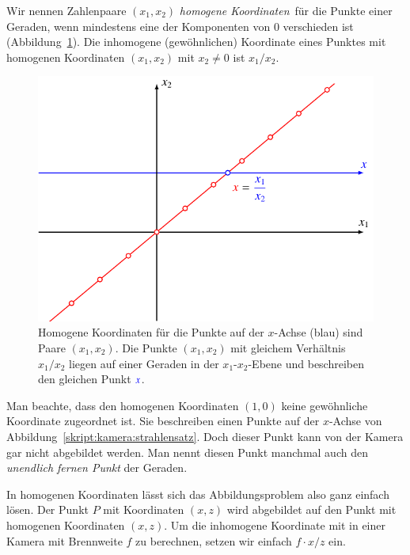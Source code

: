 \begin{definition}
Wir nennen Zahlenpaare $(x_1,x_2)$ {\em homogene Koordinaten} für die
Punkte einer Geraden, wenn mindestens eine der Komponenten von $0$
verschieden ist (Abbildung~\ref{applications:kamera:homogenekoordinaten}).
Die inhomogene (gewöhnlichen) Koordinate eines Punktes mit
homogenen Koordinaten $(x_1,x_2)$ mit $x_2\ne 0$ ist $x_1/x_2$.
\end{definition}
%
\begin{figure}
\centering
\includegraphics{applications/kamera/homogenekoordinaten.pdf}
\caption{Homogene Koordinaten für die Punkte auf der $x$-Achse
({\color{blue}blau}) sind Paare $(x_1,x_2)$.
Die Punkte {\color{red}$(x_1,x_2)$} mit gleichem Verhältnis $x_1/x_2$
liegen auf einer
Geraden in der $x_1$-$x_2$-Ebene und beschreiben den gleichen Punkt
$\color{blue}x$.
\label{applications:kamera:homogenekoordinaten}}
\end{figure}
Man beachte, dass den homogenen Koordinaten $(1,0)$ keine gewöhnliche
Koordinate zugeordnet ist.
Sie beschreiben einen Punkte auf der $x$-Achse von
Abbildung~\ref{skript:kamera:strahlensatz}.
Doch dieser Punkt kann von der Kamera gar nicht abgebildet werden.
Man nennt diesen Punkt manchmal auch den {\em unendlich fernen Punkt} der
Geraden.
%

In homogenen Koordinaten lässt sich das Abbildungsproblem also ganz
einfach lösen. 
Der Punkt $P$ mit Koordinaten $(x,z)$ wird abgebildet auf den Punkt
mit homogenen Koordinaten $(x,z)$.
Um die inhomogene Koordinate mit in einer Kamera mit Brennweite $f$ zu
berechnen, setzen wir einfach $f\cdot x/z$ ein.

